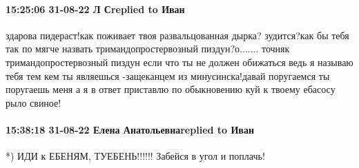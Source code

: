  
 
 
 
 

\paragraph{15:25:06 31-08-22 Л Сreplied to Иван}

здарова пидераст!как поживает твоя развальцованная дырка? зудится?как бы тебя
так по мягче назвать тримандопростервозный пиздун?о....... точняк
тримандопростервозный пиздун если что ты не должен обижаться ведь я называю
тебя тем кем ты являешься -защеканцем из минусинска!давай поругаемся ты
поругаешь меня а я в ответ приставлю по обыкновению куй к твоему ебасосу рыло
свиное!

\paragraph{15:38:18 31-08-22 Елена Анатольевнаreplied to Иван}
*)
ИДИ к ЕБЕНЯМ, ТУЕБЕНЬ!!!!!!
Забейся в угол и поплачь!

